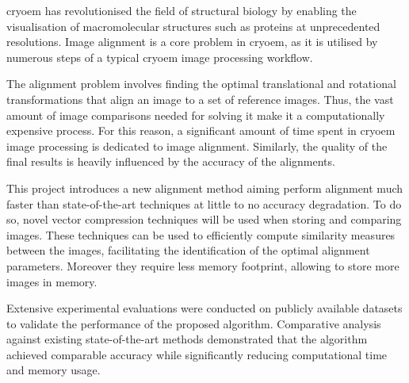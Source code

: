 \documentclass[../main.tex]{subfiles}
\begin{document}
\gls{cryoem} has revolutionised the field of structural biology by enabling the visualisation of macromolecular structures such as proteins at unprecedented resolutions. Image alignment is a core problem in \gls{cryoem}, as it is utilised by numerous steps of a typical \gls{cryoem} image processing workflow. 

The alignment problem involves finding the optimal translational and rotational transformations that align an image to a set of reference images. Thus, the vast amount of image comparisons needed for solving it make it a computationally expensive process. For this reason, a significant amount of time spent in \gls{cryoem} image processing is dedicated to image alignment. Similarly, the quality of the final results is heavily influenced by the accuracy of the alignments.

This project introduces a new alignment method aiming perform alignment much faster than state-of-the-art techniques at little to no accuracy degradation. To do so, novel vector compression techniques will be used when storing and comparing images. These techniques can be used to efficiently compute similarity measures between the images, facilitating the identification of the optimal alignment parameters. Moreover they require less memory footprint, allowing to store more images in memory.

Extensive experimental evaluations were conducted on publicly available datasets to validate the performance of the proposed algorithm. Comparative analysis against existing state-of-the-art methods demonstrated that the algorithm achieved comparable accuracy while significantly reducing computational time and memory usage.
\end{document}
